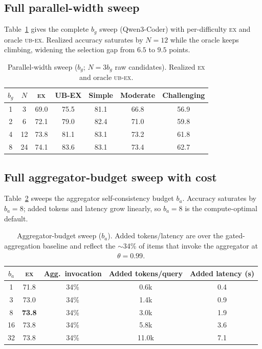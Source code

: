 \documentclass{article}
\newcommand{\ex}{\textsc{ex}\xspace}
\begin{document}
\subsection{Full parallel-width sweep}
\label{app:width}
Table~\ref{tab:s-width} gives the complete $b_g$ sweep (Qwen3-Coder) with per-difficulty \ex{} and oracle \textsc{ub-ex}. Realized accuracy saturates by $N{=}12$ while the oracle keeps climbing, widening the selection gap from $6.5$ to $9.5$ points.

\begin{table}[h]
\centering\small
\caption{Parallel-width sweep ($b_g$; $N=3b_g$ raw candidates). Realized \ex{} and oracle \textsc{ub-ex}.}
\label{tab:s-width}
\begin{tabular}{@{}ccccccc@{}}
\toprule
$b_g$ & $N$ & \textbf{\ex} & \textbf{UB-EX} & \textbf{Simple} & \textbf{Moderate} & \textbf{Challenging} \\
\midrule
1 & 3  & 69.0 & 75.5 & 81.1 & 66.8 & 56.9 \\
2 & 6  & 72.1 & 79.0 & 82.4 & 71.0 & 59.8 \\
4 & 12 & 73.8 & 81.1 & 83.1 & 73.2 & 61.8 \\
8 & 24 & 74.1 & 83.6 & 83.1 & 73.4 & 62.7 \\
\bottomrule
\end{tabular}
\end{table}

\subsection{Full aggregator-budget sweep with cost}
\label{app:ba}
Table~\ref{tab:s-ba} sweeps the aggregator self-consistency budget $b_a$. Accuracy saturates by $b_a{=}8$; added tokens and latency grow linearly, so $b_a{=}8$ is the compute-optimal default.

\begin{table}[h]
\centering\small
\caption{Aggregator-budget sweep ($b_a$). Added tokens/latency are over the gated-aggregation baseline and reflect the $\sim$34\% of items that invoke the aggregator at $\theta{=}0.99$.}
\label{tab:s-ba}
\begin{tabular}{@{}ccccc@{}}
\toprule
$b_a$ & \textbf{\ex} & \textbf{Agg.\ invocation} & \textbf{Added tokens/query} & \textbf{Added latency (s)} \\
\midrule
1  & 71.8 & 34\% & 0.6k & 0.4 \\
3  & 73.0 & 34\% & 1.4k & 0.9 \\
8  & \textbf{73.8} & 34\% & 3.0k & 1.9 \\
16 & 73.8 & 34\% & 5.8k & 3.6 \\
32 & 73.8 & 34\% & 11.0k & 7.1 \\
\bottomrule
\end{tabular}
\end{table}
\end{document}
